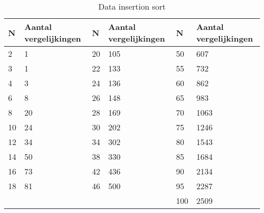 \documentclass[11pt, a4paper]{article}
\begin{document}
\begin{table}[H]
\centering
\begin{tabular}{|ll|ll|ll|}
\hline
\multicolumn{1}{|l|}{\textbf{N}} & \textbf{Aantal vergelijkingen} & \multicolumn{1}{l|}{\textbf{N}} & \textbf{Aantal vergelijkingen} & \multicolumn{1}{l|}{\textbf{N}} & \textbf{Aantal vergelijkingen} \\ \hline
2                                & 1                              & 20                              & 105                            & 50                              & 607                            \\
3                                & 1                              & 22                              & 133                            & 55                              & 732                            \\
4                                & 3                              & 24                              & 136                            & 60                              & 862                            \\
6                                & 8                              & 26                              & 148                            & 65                              & 983                            \\
8                                & 20                             & 28                              & 169                            & 70                              & 1063                           \\
10                               & 24                             & 30                              & 202                            & 75                              & 1246                           \\
12                               & 34                             & 34                              & 302                            & 80                              & 1543                           \\
14                               & 50                             & 38                              & 330                            & 85                              & 1684                           \\
16                               & 73                             & 42                              & 436                            & 90                              & 2134                           \\
18                               & 81                             & 46                              & 500                            & 95                              & 2287                           \\
                                 &                                &                                 &                                & 100                             & 2509                           \\ \hline
\end{tabular}
\caption{Data insertion sort}
\label{insertion}
\end{table}
\end{document}
